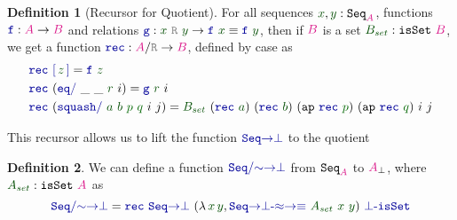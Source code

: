 \documentclass[twoside,11pt,openright]{report}
\theoremstyle{plain} %
\theoremstyle{definition}
\newtheorem{defn}{Definition}[section]
\theoremstyle{remark}
\newcommand*{\term}[1]{\textcolor{green!30!black}{#1}} %
\newcommand*{\pathterm}[1]{\textcolor{green!40!black}{#1}}
\newcommand*{\type}[1]{\textcolor{magenta!90!black}{#1}}
\newcommand*{\relation}[1]{\textcolor{gray}{\ensuremath{\mathtt{#1}}}}
\newcommand*{\function}[1]{\textcolor{blue!60!black}{\ensuremath{\mathtt{#1}}}}
\newcommand*{\typeformer}[1]{\ensuremath{\mathtt{#1}}}
\begin{document}
\begin{defn}[Recursor for Quotient]
  For all sequences \(\term{x}, \term{y} : \typeformer{Seq}_{\type{A}}\), functions \(\function{f} : \type{A} \rightarrow \type{B}\) and relations \(\function{g} : \term{x}~\relation{R}~\term{y} \rightarrow \function{f}~\term{x} \equiv \function{f}~\term{y}\), then if \(\type{B}\) is a set \(\term{B_{set}} : \typeformer{isSet}~\type{B}\), we get a function \(\function{rec} : \type{A} / \relation{R} \rightarrow \type{B}\), defined by case as
  \begin{equation}
    \begin{aligned}
      &\function{rec}~\function{[}\,\term{z}\,\function{]} = \function{f}~\term{z} \\
      &\function{rec}~(\function{eq/}~\_~\_~\term{r}~i) = \function{g}~\term{r}~i \\
      &\function{rec}~(\function{squash/}~\term{a}~\term{b}~\pathterm{p}~\pathterm{q}~i~j) = \term{B_{set}}~(\function{rec}~\term{a})~(\function{rec}~\term{b})~(\mathtt{ap}~\function{rec}~\pathterm{p})~(\mathtt{ap}~\function{rec}~\pathterm{q})~i~j
    \end{aligned}
  \end{equation}
\end{defn}
This recursor allows us to lift the function \(\function{Seq{\rightarrow}\bot}\) to the quotient
\begin{defn}
  \label{eq:QuotientedSeqToPartialityMonad}
  We can define a function \(\function{Seq/{\sim}{\rightarrow}\bot}\) from \(\typeformer{Seq}_{\type{A}}\) to \(\type{A}_{\bot}\), where \(\term{A_{set}} : \typeformer{isSet}~\type{A}\) as
  \begin{equation}
    \function{Seq/{\sim}{\rightarrow}\bot} = \function{rec}~\function{Seq{\rightarrow}\bot}~(\lambda\,\term{x}\,\term{y}, \function{Seq{\rightarrow}\bot\text{-}{\approx}{\rightarrow}{\equiv}}~\term{A_{set}}~\term{x}~\term{y})~\function{\bot\text{-}isSet}
  \end{equation} 
\end{defn}
\end{document}
